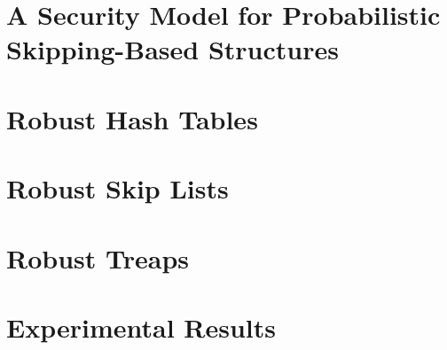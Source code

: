 \section{A Security Model for Probabilistic Skipping-Based Structures}


\section{Robust Hash Tables}\label{sec:ht}


\section{Robust Skip Lists}\label{sec:skiplist}


\section{Robust Treaps}\label{sec:treaps}


\section{Experimental Results}\label{sec:experimental}

